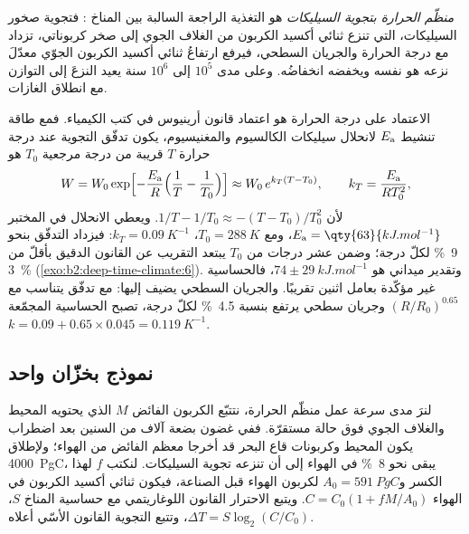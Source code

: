 \begin{definition}\label{def:b2:deep-time-climate:thermostat}
\emph{منظّم الحرارة بتجوية السيليكات} هو التغذية الراجعة
السالبة بين المناخ : فتجوية صخور السيليكات، التي
تنزع ثنائي أكسيد الكربون من الغلاف الجوي إلى صخر كربوناتي، تزداد مع درجة الحرارة
والجريان السطحي، فيرفع ارتفاعُ ثنائي أكسيد الكربون الجوّي معدّلَ نزعه هو نفسه
ويخفضه انخفاضُه. وعلى مدى $10^5$ إلى $10^6$ سنة يعيد النزعَ إلى التوازن مع
انطلاق الغازات.
\end{definition}

الاعتماد على درجة الحرارة هو اعتماد قانون أرينيوس في كتب الكيمياء. فمع طاقة
تنشيط $E_{\text a}$ لانحلال سيليكات الكالسيوم والمغنيسيوم، يكون تدفّق التجوية عند
درجة حرارة $T$ قريبة من درجة مرجعية $T_0$ هو
\[
  W = W_0 \exp\Bigl[-\frac{E_{\text a}}{R}\Bigl(\frac1T - \frac1{T_0}\Bigr)\Bigr]
  \approx W_0\, e^{k_T (T - T_0)}, \qquad k_T = \frac{E_{\text a}}{R T_0^2},
\]
لأن $1/T - 1/T_0 \approx -(T - T_0)/T_0^2$. ويعطي الانحلال في المختبر $E_{\text a} =
\qty{63}{kJ.mol^{-1}}$، ومع $T_0 = \qty{288}{K}$، $k_T = \qty{0.09}{K^{-1}}$: فيزداد التدفّق
بنحو \qty{9}{\percent} لكلّ درجة؛ وضمن عشر درجات من $T_0$ يبتعد التقريب
عن القانون الدقيق بأقلّ من \qty{3}{\percent} (\cref{exo:b2:deep-time-climate:6}). وتقدير ميداني هو
$74 \pm \qty{29}{kJ.mol^{-1}}$، فالحساسية غير مؤكّدة بعامل اثنين تقريبًا. والجريان السطحي
يضيف إليها: مع تدفّق يتناسب مع $(R/R_0)^{0.65}$ وجريان سطحي يرتفع بنسبة
\qty{4.5}{\percent} لكلّ درجة، تصبح الحساسية المجمّعة $k = 0.09 + 0.65\times0.045 =
\qty{0.119}{K^{-1}}$.

\subsection*{نموذج بخزّان واحد}

لنرَ مدى سرعة عمل منظّم الحرارة، نتتبّع الكربون الفائض $M$ الذي يحتويه المحيط والغلاف الجوي
فوق حالة مستقرّة. ففي غضون بضعة آلاف من السنين بعد اضطراب يكون المحيط وكربونات قاع البحر
قد أخرجا معظم الفائض من الهواء؛ ولإطلاق \qty{4000}{PgC}، يبقى نحو
\qty{8}{\percent} في الهواء إلى أن تنزعه تجوية السيليكات. لنكتب $f$ لهذا
الكسر و$A_0 = \qty{591}{PgC}$ لكربون الهواء قبل الصناعة، فيكون ثنائي أكسيد الكربون
في الهواء $C = C_0(1 + fM/A_0)$. ويتبع الاحترار القانون اللوغاريتمي مع حساسية
المناخ $S$، $\Delta T = S\log_2(C/C_0)$، وتتبع التجوية القانون الأسّي أعلاه.

